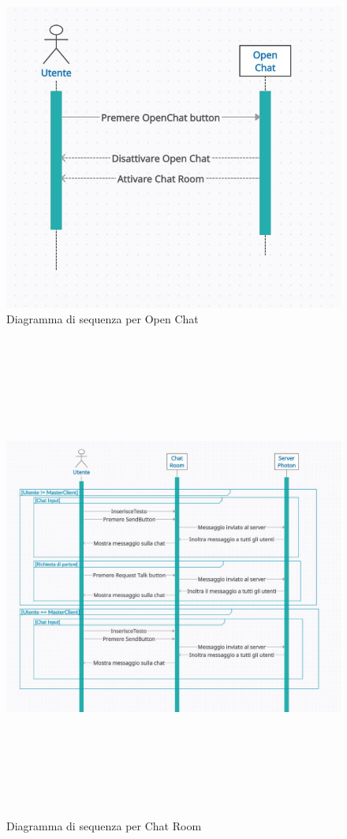 \begin{figure}[H]
    \centering
    \includegraphics[scale = 0.65]{Immagini/Openchatdiagramma.jpg}
    \caption{Diagramma di sequenza per Open Chat}
    \label{fig:my_label}
\end{figure}    
\begin{figure}[H]
    \centering
    \includegraphics[width = 16cm, height = 16cm]{Immagini/ChatRoomddiagramma.jpg}
    \caption{Diagramma di sequenza per Chat Room}
    \label{fig:my_label}
    \end{figure}
